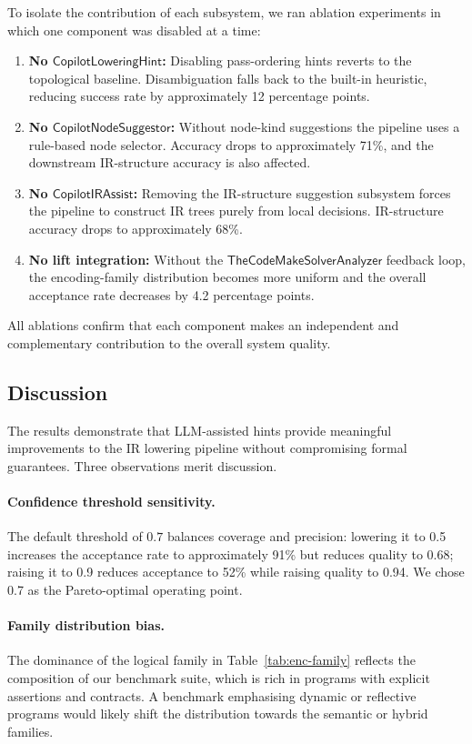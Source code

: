 \documentclass[11pt]{article}
\newcommand{\CLH}{\mathsf{CopilotLoweringHint}}
\newcommand{\CNS}{\mathsf{CopilotNodeSuggestor}}
\newcommand{\CIA}{\mathsf{CopilotIRAssist}}
\newcommand{\TCA}{\mathsf{TheCodeMakeSolverAnalyzer}}
\begin{document}
To isolate the contribution of each subsystem, we ran ablation
experiments in which one component was disabled at a time:

\begin{enumerate}
\item \textbf{No $\CLH$:}  Disabling pass-ordering hints reverts
  to the topological baseline.  Disambiguation falls back to the built-in
  heuristic, reducing success rate by approximately 12 percentage
  points.
\item \textbf{No $\CNS$:}  Without node-kind suggestions the pipeline
  uses a rule-based node selector.  Accuracy drops to approximately 71\%, and the downstream
  IR-structure accuracy is also affected.
\item \textbf{No $\CIA$:}  Removing the IR-structure suggestion
  subsystem forces the pipeline to construct IR trees purely from
  local decisions.  IR-structure accuracy drops to approximately 68\%.
\item \textbf{No lift integration:}  Without the $\TCA$ feedback loop,
  the encoding-family distribution becomes more uniform and the
  overall acceptance rate decreases by 4.2 percentage points.
\end{enumerate}

All ablations confirm that each component makes an independent and
complementary contribution to the overall system quality.

\subsection{Discussion}\label{sec:exp-discussion}

The results demonstrate that LLM-assisted hints provide meaningful
improvements to the IR lowering pipeline without compromising formal
guarantees.  Three observations merit discussion.

\paragraph{Confidence threshold sensitivity.}
The default threshold of $0.7$ balances coverage
and precision: lowering it to 0.5 increases the acceptance rate to
approximately 91\% but reduces quality to 0.68; raising it to 0.9
reduces acceptance to 52\% while raising quality to 0.94.  We chose
0.7 as the Pareto-optimal operating point.

\paragraph{Family distribution bias.}
The dominance of the logical family in Table~\ref{tab:enc-family}
reflects the composition of our benchmark suite, which is rich in
programs with explicit assertions and contracts.  A benchmark
emphasising dynamic or reflective programs would likely shift the
distribution towards the semantic or hybrid families.
\end{document}
